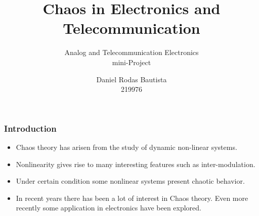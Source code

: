 \documentclass{beamer}
\title{Chaos in Electronics and Telecommunication}
\subtitle{Analog and Telecommunication Electronics\\
mini-Project\\}
\institute{Politecnico di Torino}
\author{Daniel Rodas Bautista\\
219976\\}
\begin{document}
\frame{\titlepage}

\begin{frame}
        \frametitle{Introduction}
        \begin{itemize}
                \item Chaos theory has arisen from the study of dynamic non-linear systems. 
                \item Nonlinearity gives rise to many interesting features such as inter-modulation. 
                \item Under certain condition some nonlinear systems  present chaotic behavior.
                \item In recent years there has been a lot of interest in Chaos theory. Even more recently some application in electronics have been explored.
        \end{itemize}

\end{frame}
\end{document}
